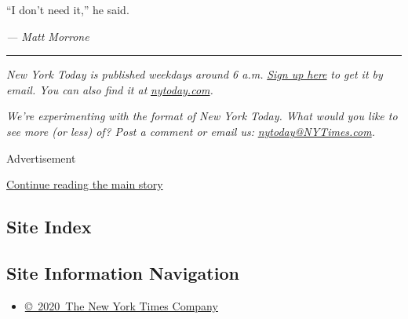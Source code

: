 ``I don't need it,'' he said.

\emph{--- Matt Morrone}

\begin{center}\rule{0.5\linewidth}{\linethickness}\end{center}

\emph{New York Today is published weekdays around 6 a.m.}
\href{https://www.nytimes3xbfgragh.onion/newsletters/newyorktoday?module=inline}{\emph{Sign
up here}} \emph{to get it by email. You can also find it at}
\href{http://www.nytoday.com/}{\emph{nytoday.com}}\emph{.}

\emph{We're experimenting with the format of New York Today. What would
you like to see more (or less) of? Post a comment or email us:}
\href{mailto:nytoday@NYTimes.com}{\emph{nytoday@NYTimes.com}}\emph{.}

Advertisement

\protect\hyperlink{after-bottom}{Continue reading the main story}

\hypertarget{site-index}{%
\subsection{Site Index}\label{site-index}}

\hypertarget{site-information-navigation}{%
\subsection{Site Information
Navigation}\label{site-information-navigation}}

\begin{itemize}
\tightlist
\item
  \href{https://help.nytimes3xbfgragh.onion/hc/en-us/articles/115014792127-Copyright-notice}{©~2020~The
  New York Times Company}
\end{itemize}

